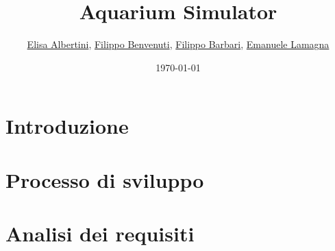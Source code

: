 \documentclass[12pt,a4paper,oneside,article]{article}
\title{Aquarium Simulator}
\author{
	\href{mailto:elisa.albertini3@studio.unibo.it}{Elisa Albertini},
	\href{mailto:filippo.benvenuti3@studio.unibo.it}{Filippo Benvenuti},
	\href{mailto:filippo.barbari@studio.unibo.it}{Filippo Barbari},
	\href{mailto:emanuele.lamagna@studio.unibo.it}{Emanuele Lamagna}
}
\date{\today}
\begin{document}
	\maketitle
	
	\tableofcontents
	\clearpage

    \section{Introduzione}
    
    \section{Processo di sviluppo}
    
    \section{Analisi dei requisiti}
\end{document}
